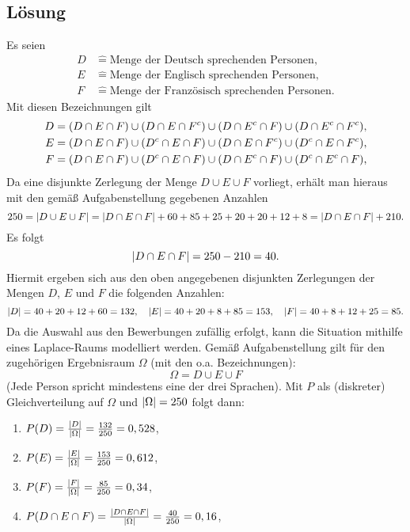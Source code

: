 \documentclass{exercise}
\begin{document}
    \subsection*{Lösung}
    Es seien
    \begin{align*}
        D &\hat{=} \text{Menge der Deutsch sprechenden Personen},\\
        E &\hat{=} \text{Menge der Englisch sprechenden Personen},\\
        F &\hat{=} \text{Menge der Französisch sprechenden Personen}.
    \end{align*}
    Mit diesen Bezeichnungen gilt
    \begin{align*}
        D &= \parentheses*{D \cap E \cap F} \cup \parentheses*{D \cap E \cap F^c} \cup \parentheses*{D \cap E^c \cap F} \cup \parentheses*{D \cap E^c \cap F^c},\\
        E &= \parentheses*{D \cap E \cap F} \cup \parentheses*{D^c \cap E \cap F} \cup \parentheses*{D \cap E \cap F^c} \cup \parentheses*{D^c \cap E \cap F^c},\\
        F &= \parentheses*{D \cap E \cap F} \cup \parentheses*{D^c \cap E \cap F} \cup \parentheses*{D \cap E^c \cap F} \cup \parentheses*{D^c \cap E^c \cap F},\\
    \end{align*}
    Da eine disjunkte Zerlegung der Menge \(D \cup E \cup F\) vorliegt, erhält man hieraus mit den gemäß Aufgabenstellung gegebenen Anzahlen
    \[
        250 = \absolute*{D \cup E \cup F} = \absolute*{D \cap E \cap F} + 60 + 85 + 25 + 20 + 20 + 12 + 8 = \absolute*{D \cap E \cap F} + 210.
    \]
    Es folgt
    \[
        \absolute*{D \cap E \cap F} = 250 - 210 = 40.
    \]
    Hiermit ergeben sich aus den oben angegebenen disjunkten Zerlegungen der Mengen \(D\), \(E\) und \(F\) die folgenden Anzahlen:
    \[
        \absolute*{D} = 40 + 20 + 12 + 60 = 132, \quad \absolute*{E} = 40 + 20 + 8 + 85 = 153, \quad \absolute*{F} = 40 + 8 + 12 + 25 = 85.
    \]
    Da die Auswahl aus den Bewerbungen zufällig erfolgt, kann die Situation mithilfe eines Laplace-Raums modelliert werden.
    Gemäß Aufgabenstellung gilt für den zugehörigen Ergebnisraum \(\Omega\) (mit den o.a. Bezeichnungen):
    \[
        \Omega = D \cup E \cup F
    \]
    (Jede Person spricht mindestens eine der drei Sprachen).
    Mit \(P\) als (diskreter) Gleichverteilung auf \(\Omega\) und \(\absolute*{\Omega} = 250\) folgt dann:
    \begin{enumerate}
        \item \(P\parentheses*{D} = \frac{\absolute*{D}}{\absolute*{\Omega}} = \frac{132}{250} = 0,528\),
        \item \(P\parentheses*{E} = \frac{\absolute*{E}}{\absolute*{\Omega}} = \frac{153}{250} = 0,612\),
        \item \(P\parentheses*{F} = \frac{\absolute*{F}}{\absolute*{\Omega}} = \frac{85}{250} = 0,34\),
        \item \(P\parentheses*{D \cap E \cap F} = \frac{\absolute*{D \cap E \cap F}}{\absolute*{\Omega}} = \frac{40}{250} = 0,16\),
    \end{enumerate}
\end{document}
